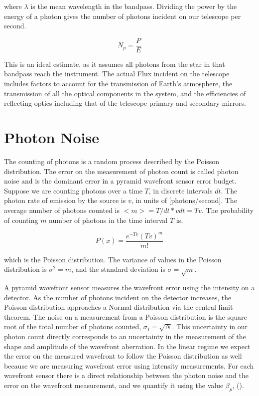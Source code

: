 where $\lambda$ is the mean wavelength in the bandpass. Dividing the power by the energy of a photon gives the number of photons incident on our telescope per second.

\begin{equation}
    N_p=\frac{P}{E}
\end{equation}

This is an ideal estimate, as it assumes all photons from the star in that bandpass reach the instrument. The actual Flux incident on the telescope includes factors to account for the transmission of Earth's atmosphere, the transmission of all the optical components in the system, and the efficiencies of reflecting optics including that of the telescope primary and secondary mirrors. 


\section{Photon Noise}

The counting of photons is a random process described by the Poisson distribution. The error on the measurement of photon count is called photon noise and is the dominant error in a pyramid wavefront sensor error budget. Suppose we are counting photons over a time $T$, in discrete intervals $dt$. The photon rate of emission by the source is $v$, in units of [photons/second]. The average number of photons counted is $<m>=T/dt * vdt=Tv$. The probability of counting $m$ number of photons in the time interval $T$ is,

\begin{equation}
    P(x)=\frac{e^{-Tv} (Tv)^m}{m!}
\end{equation}

which is the Poisson distribution. The variance of values in the Poisson distribution is $\sigma^2=m$, and the standard deviation is $\sigma=\sqrt{m}$. 

A pyramid wavefront sensor measures the wavefront error using the intensity on a detector. As the number of photons incident on the detector increases, the Poisson distribution approaches a Normal distribution via the central limit theorem. The noise on a measurement from a Poisson distribution is the square root of the total number of photons counted, $\sigma_I=\sqrt{N}.$ This uncertainty in our photon count directly corresponds to an uncertainty in the measurement of the shape and amplitude of the wavefront aberration. In the linear regime we expect the error on the measured wavefront to follow the Poisson distribution as well because we are measuring wavefront error using intensity measurements. For each wavefront sensor there is a direct relationship between the photon noise and the error on the wavefront measurement, and we quantify it using the value $\beta_p $, (\cite{guyon2005}).

